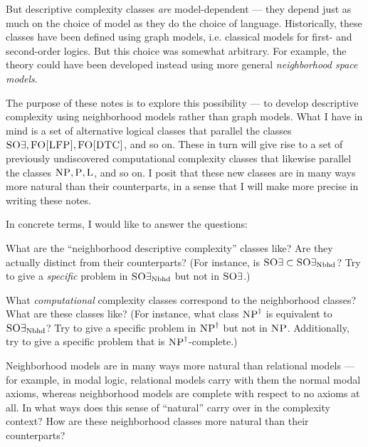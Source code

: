 \documentclass[letterpaper]{article}
\begin{document}
But descriptive complexity classes \emph{are} model-dependent --- they depend just as much on the choice of model as they do the choice of language.  Historically, these classes have been defined using graph models, i.e. classical models for first- and second-order logics.  But this choice was somewhat arbitrary.  For example, the theory could have been developed instead using more general \emph{neighborhood space models}.

The purpose of these notes is to explore this possibility --- to develop descriptive complexity using neighborhood models rather than graph models.  What I have in mind is a set of alternative logical classes that parallel the classes $\mbox{\sc SO}\exists, \mbox{\sc FO[LFP]}, \mbox{\sc FO[DTC]}$, and so on.  These in turn will give rise to a set of previously undiscovered computational complexity classes that likewise parallel the classes $\mbox{\sc NP}, \mbox{\sc P}, \mbox{\sc L}$, and so on.  I posit that these new classes are in many ways more natural than their counterparts, in a sense that I will make more precise in writing these notes.  

In concrete terms, I would like to answer the questions:

\begin{question}
    What are the ``neighborhood descriptive complexity'' classes like? Are they actually distinct from their counterparts?  (For instance, is $\mbox{\sc SO}\exists \subset \mbox{\sc SO}\exists_\mathrm{Nbhd}$?  Try to give a \emph{specific} problem in $\mbox{\sc SO}\exists_\mathrm{Nbhd}$ but not in $\mbox{\sc SO}\exists$.)
\end{question}


\begin{question}
    What \emph{computational} complexity classes correspond to the neighborhood classes?  What are these classes like?  (For instance, what class $\mbox{\sc NP}^\dagger$ is equivalent to $\mbox{\sc SO}\exists_\mathrm{Nbhd}$? Try to give a specific problem in $\mbox{\sc NP}^\dagger$ but not in $\mbox{\sc NP}$.  Additionally, try to give a specific problem that is $\mbox{\sc NP}^\dagger$-complete.)
\end{question}


\begin{question}
    Neighborhood models are in many ways more natural than relational models --- for example, in modal logic, relational models carry with them the normal modal axioms, whereas neighborhood models are complete with respect to no axioms at all.  In what ways does this sense of ``natural'' carry over in the complexity context?  How are these neighborhood classes more natural than their counterparts?
\end{question}
\end{document}
